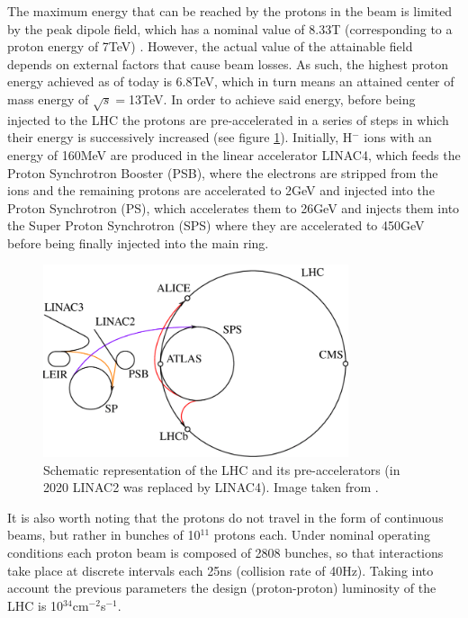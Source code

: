 \documentclass[main]{subfiles} %
\begin{document}
The maximum energy that can be reached by the protons in the beam is limited by the peak dipole field, which has a nominal value of 8.33\;T (corresponding to a proton energy of 7\;TeV) \cite{Bruning2004}. However, the actual value of the attainable field depends on external factors that cause beam losses. As such, the highest proton energy achieved as of today is 6.8\;TeV, which in turn means an attained center of mass energy of $\sqrt{s} = $13\;TeV. In order to achieve said energy, before being injected to the LHC the protons are pre-accelerated in a series of steps in which their energy is successively increased (see figure \ref{fig:preaccelerators}). Initially, H$^-$ ions with an energy of 160\;MeV are produced in the linear accelerator LINAC4, which feeds the Proton Synchrotron Booster (PSB), where the electrons are stripped from the ions and the remaining protons are accelerated to 2\;GeV and injected into the Proton Synchrotron (PS), which accelerates them to 26\;GeV and injects them into the Super Proton Synchrotron (SPS) where they are accelerated to 450\;GeV before being finally injected into the main ring.\\

\begin{figure}[h]
    \centering
    \includegraphics[width=0.8\textwidth]{../Figures/Theory/LHC_preaccelerators.png}
    \caption{Schematic representation of the LHC and its pre-accelerators (in 2020 LINAC2 was replaced by LINAC4). Image taken from \cite{Michael2011}.}
    \label{fig:preaccelerators}
\end{figure}

It is also worth noting that the protons do not travel in the form of continuous beams, but rather in bunches of 10$^{11}$ protons each. Under nominal operating conditions each proton beam is composed of 2808 bunches, so that interactions take place at discrete intervals each 25\;ns (collision rate of 40\;Hz). Taking into account the previous parameters the design (proton-proton) luminosity of the LHC is 10$^{34}$\;cm$^{-2}$s$^{-1}$.\\ 
\end{document}

